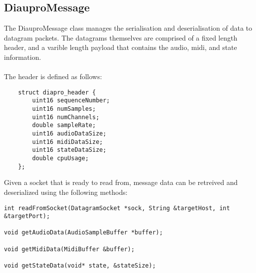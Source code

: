 \subsection{DiauproMessage}

The DiauproMessage class manages the serialisation and deserialisation of data to datagram packets. The datagrams themselves are comprised of a fixed length header, and a varible length payload that contains the audio, midi, and state information.\\
\\
The header is defined as follows:

\begin{lstlisting}
    struct diapro_header {
        uint16 sequenceNumber;
        uint16 numSamples;
        uint16 numChannels;
        double sampleRate;
        uint16 audioDataSize;
        uint16 midiDataSize;
        uint16 stateDataSize;
        double cpuUsage;
    };
\end{lstlisting}

\noindent
Given a socket that is ready to read from, message data can be retreived and deserialized using the following methods:

\begin{lstlisting}
int readFromSocket(DatagramSocket *sock, String &targetHost, int &targetPort);

void getAudioData(AudioSampleBuffer *buffer);

void getMidiData(MidiBuffer &buffer);

void getStateData(void* state, &stateSize);
\end{lstlisting}



